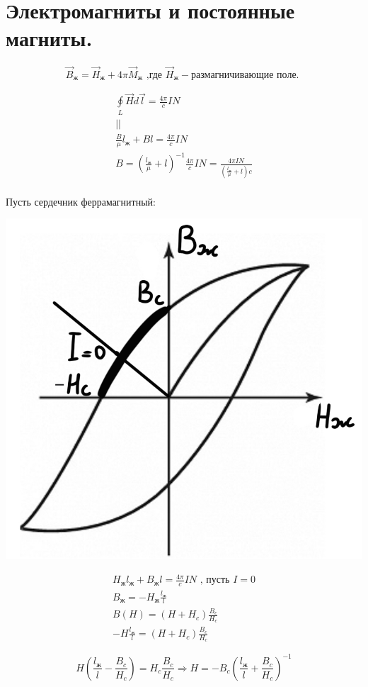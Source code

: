 \section{Электромагниты и постоянные магниты.}


\[
\vec{B}_{\text{ж}}=\vec{H}_{\text{ж}}+4\pi\vec{M}_{\text{ж}} \text{ ,где  }
\vec{H}_{\text{ж}}-\text{размагничивающие поле. }
\]

\begin{gather*}
    \underset{L}{\oint}\vec{H}d\vec{l}=\frac{4\pi}{c}IN \\
    || \\
    \frac{B}{\mu}l_{\text{ж}}+Bl=\frac{4\pi}{c}IN \\
    B=\left( \frac{l_{\text{ж}}}{\mu}+l  \right)^{-1} \frac{4\pi}{c}IN= \frac{4\pi IN}{\left( \frac{l_{\text{ж}}}{\mu} +l \right)c} \\
\end{gather*}

Пусть сердечник феррамагнитный:

\begin{minipage}[c]{0.4\textwidth} %
    \includegraphics[width=\textwidth]{im/83.png} %
\end{minipage}%
\hfill
\begin{minipage}[c]{0.6\textwidth} %
    \begin{gather*}
        H_{\text{ж}}l_{\text{ж}}+B_{\text{ж}}l=\frac{4\pi}{c}IN \text{ , пусть } I=0 \\
        B_{\text{ж}}=-H_{\text{ж}}\frac{l_{\text{ж}}}{l} \\
        B(H)=(H+H_c)\frac{B_c}{H_c} \\
        -H\frac{l_{\text{ж}}}{l}=(H+H_c)\frac{B_c}{H_c}     
    \end{gather*}
\end{minipage}
\[
H\left( \frac{l_{\text{ж}}}{l}-\frac{B_c}{H_c}  \right)=H_c \frac{B_c}{H_c}\Rightarrow \boxed{H=-B_c\left( \frac{l_{\text{ж}}}{l}+\frac{B_c}{H_c}  \right)^{-1} } 
\]

